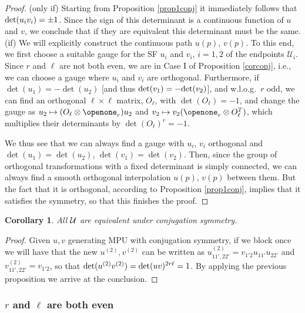 \documentclass[pra,twocolumn,nofootinbib,superscriptaddress]{revtex4-1}
\newtheorem{cor}[thm]{Corollary}
\begin{document}
\begin{proof}
	{(only if)} Starting from Proposition \ref{prop1conj} it immediately
	follows that ${\rm det}(u_iv_i)=\pm 1$. Since the sign of this determinant
	is a continuous function of $u$ and $v$, we conclude that if they are
	equivalent this determinant must be the same.
	\\[0.5ex]
	(if) We will explicitly construct the continuous path $u(p)$, $v(p)$. To
	this end, we first choose a suitable gauge for the SF
	$u_i$ and $v_i$, $i=1,2$ of the endpoints $\mathcal U_{i}$.
	Since $r$ and $\ell$ are not both even, we are
	in Case I of Proposition \ref{corconj}, i.e., we can choose a gauge where
	$u_i$ and $v_i$ are orthogonal. Furthermore, if $\det(u_1)=-\det(u_2)$
	[and thus
	${\rm det}(v_1)=-{\rm det}(v_2)$], and w.l.o.g.\ $r$ odd, we can find an
	orthogonal $\ell\times \ell$ matrix, $O_\ell$, with $\det(O_\ell)=-1$,
	and change the gauge as $u_2\mapsto (O_\ell\otimes \openone_r) u_2$ and
	$v_2\mapsto v_2 (\openone_r\otimes O_\ell^T)$, which multiplies their
	determinants by $\det(O_\ell)^r=-1$.

	We thus see that we can always find a gauge with $u_i$, $v_i$ orthogonal
	and $\det(u_1)=\det(u_2)$, $\det(v_1)=\det(v_2)$.  Then, since the
	group of orthogonal transformations with a fixed determinant is simply
	connected, we can always find a smooth orthogonal interpolation $u(p)$,
	$v(p)$ between them.  But the fact that it is orthogonal, according to
	Proposition \ref{prop1conj}, implies that it satisfies the symmetry, so
	that this finishes the proof.
\end{proof}



\begin{cor}
	All ${\cal U}$ are equivalent under conjugation symmetry.
\end{cor}

\begin{proof}
	Given $u,v$ generating MPU with conjugation symmetry, if we block once we
	will have that the new $u^{(2)},v^{(2)}$ can be written as
	$u^{(2)}_{11',22'}= v_{1'2}u_{11'}u_{22'}$ and
	$v^{(2)}_{11',22'}=v_{1'2}$, so that ${\rm det}(u^{(2)}v^{(2)})={\rm det}(
		uv)^{2 r\ell}=1$. By applying the previous proposition we arrive at the
	conclusion.  \end{proof}


\subsubsection{$r$ and $\ell$ are both even}
\end{document}
